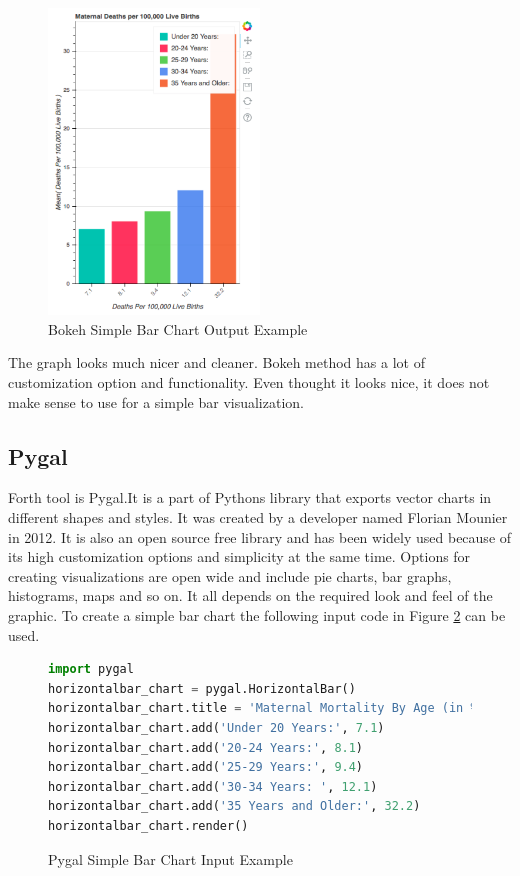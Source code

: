 \documentclass[sigconf]{acmart}
\begin{document}
\begin{figure}
  \centering
  \includegraphics[width=0.5\textwidth]{images/output_3_0.png}
  \caption{Bokeh Simple Bar Chart Output Example \cite{md}} \label{fig:figure6} 
\end{figure}

The graph looks much nicer and cleaner. Bokeh method has a lot of customization option and functionality. Even thought it looks nice, it does not make sense to use for a simple bar visualization. 

\subsection{Pygal}

Forth tool is Pygal.It is a part of Python\textquotesingle s library that exports vector charts in different shapes and styles. It was created by a developer named Florian Mounier in 2012. It is also an open source free library and has been widely used because of its high customization options and simplicity at the same time. Options for creating visualizations are open wide and include pie charts, bar graphs, histograms, maps and so on. It all depends on the required look and feel of the graphic. To create a simple bar chart the following input code in Figure  \ref{fig:figure7} \cite{md} can be used.

\begin{figure}
   \begin{lstlisting}[language=Python]
import pygal
horizontalbar_chart = pygal.HorizontalBar()
horizontalbar_chart.title = 'Maternal Mortality By Age (in %)'
horizontalbar_chart.add('Under 20 Years:', 7.1)
horizontalbar_chart.add('20-24 Years:', 8.1)
horizontalbar_chart.add('25-29 Years:', 9.4)
horizontalbar_chart.add('30-34 Years: ', 12.1)
horizontalbar_chart.add('35 Years and Older:', 32.2)
horizontalbar_chart.render()
\end{lstlisting}
\caption{Pygal Simple Bar Chart Input Example \cite{md}}
\label{fig:figure7}
\end{figure}
\end{document}
